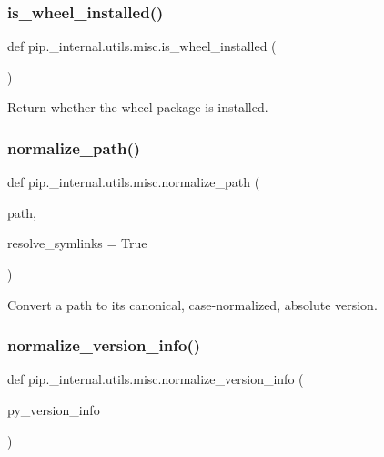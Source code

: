 \subsubsection{\texorpdfstring{is\+\_\+wheel\+\_\+installed()}{is\_wheel\_installed()}}
{\footnotesize\ttfamily def pip.\+\_\+internal.\+utils.\+misc.\+is\+\_\+wheel\+\_\+installed (\begin{DoxyParamCaption}{ }\end{DoxyParamCaption})}

\begin{DoxyVerb}Return whether the wheel package is installed.
\end{DoxyVerb}
 \mbox{\label{namespacepip_1_1__internal_1_1utils_1_1misc_a9594cfa80c3e1c931446b2ea25904443}} 
\subsubsection{\texorpdfstring{normalize\+\_\+path()}{normalize\_path()}}
{\footnotesize\ttfamily def pip.\+\_\+internal.\+utils.\+misc.\+normalize\+\_\+path (\begin{DoxyParamCaption}\item[{}]{path,  }\item[{}]{resolve\+\_\+symlinks = {\ttfamily True} }\end{DoxyParamCaption})}

\begin{DoxyVerb}Convert a path to its canonical, case-normalized, absolute version.\end{DoxyVerb}
 \mbox{\label{namespacepip_1_1__internal_1_1utils_1_1misc_a6b617962ff695a9a8dd904b9823f816f}} 
\subsubsection{\texorpdfstring{normalize\+\_\+version\+\_\+info()}{normalize\_version\_info()}}
{\footnotesize\ttfamily def pip.\+\_\+internal.\+utils.\+misc.\+normalize\+\_\+version\+\_\+info (\begin{DoxyParamCaption}\item[{}]{py\+\_\+version\+\_\+info }\end{DoxyParamCaption})}

